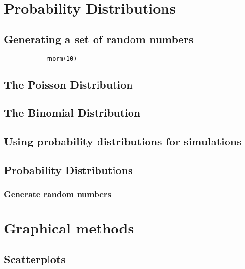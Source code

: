\documentclass[a4paper,12pt]{article}
\begin{document}
\begin{itemize}
		
		
		
		\newpage
		\chapter{Probability Distributions}
		\section{Generating a set of random numbers}
		
		\begin{framed}
			\large \begin{verbatim}
			rnorm(10)
			\end{verbatim}\large
		\end{framed}
		
		\section{The Poisson Distribution}
		\section{The Binomial Distribution}
		\section{Using probability distributions for simulations}
		\section{Probability Distributions}
		\subsection{Generate random numbers }
		
		\newpage
		\chapter{Graphical methods}
		
		\section{Scatterplots}
		

\end{itemize}
\end{document}
